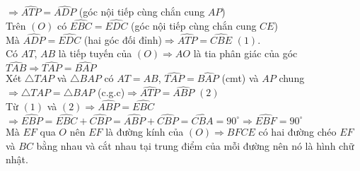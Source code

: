 \begin{ex}
{\begin{enumerate}
$\Rightarrow\widehat{ATP}=\widehat{ADP}$ (góc nội tiếp cùng chắn cung $AP$)\\
Trên $(O)$ có $\widehat{EBC}=\widehat{EDC}$ (góc nội tiếp cùng chắn cung $CE$)\\
Mà $\widehat{ADP}=\widehat{EDC}$ (hai góc đối đỉnh)$\Rightarrow\widehat{ATP}=\widehat{CBE}$ $(1)$.\\
Có $AT$, $AB$ là tiếp tuyến của $(O)\Rightarrow AO$ là tia phân giác của góc $\widehat{TAB}\Rightarrow\widehat{TAP}=\widehat{BAP}$\\
Xét $\triangle TAP$ và $\triangle BAP$ có $AT=AB$, $\widehat{TAP}=\widehat{BAP}$ (cmt) và $AP$ chung\\ 
$\Rightarrow \triangle TAP=\triangle BAP$ (c.g.c)$\Rightarrow\widehat{ATP}=\widehat{ABP}$ $(2)$\\
Từ $(1)$ và $(2)\Rightarrow\widehat{ABP}=\widehat{EBC}$\\
$\Rightarrow\widehat{EBP}=\widehat{EBC}+\widehat{CBP}=\widehat{ABP}+\widehat{CBP}=\widehat{CBA}=90^\circ\Rightarrow\widehat{EBF}=90^\circ$\\
Mà $EF$ qua $O$ nên $EF$ là đường kính của $(O)\Rightarrow BFCE$ có hai đường chéo $EF$ và $BC$ bằng nhau và cắt nhau tại trung điểm của mỗi đường nên nó là hình chữ nhật.
\end{enumerate}
}
\end{ex}

